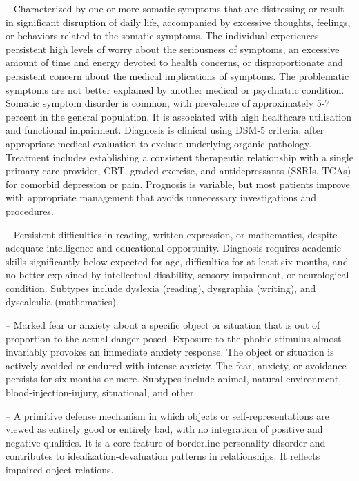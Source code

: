 -- Characterized by one or more somatic symptoms that are distressing or result in significant disruption of daily life, accompanied by excessive thoughts, feelings, or behaviors related to the somatic symptoms. The individual experiences persistent high levels of worry about the seriousness of symptoms, an excessive amount of time and energy devoted to health concerns, or disproportionate and persistent concern about the medical implications of symptoms. The problematic symptoms are not better explained by another medical or psychiatric condition. Somatic symptom disorder is common, with prevalence of approximately 5-7 percent in the general population. It is associated with high healthcare utilisation and functional impairment. Diagnosis is clinical using DSM-5 criteria, after appropriate medical evaluation to exclude underlying organic pathology. Treatment includes establishing a consistent therapeutic relationship with a single primary care provider, CBT, graded exercise, and antidepressants (SSRIs, TCAs) for comorbid depression or pain. Prognosis is variable, but most patients improve with appropriate management that avoids unnecessary investigations and procedures.

-- Persistent difficulties in reading, written expression, or mathematics, despite adequate intelligence and educational opportunity. Diagnosis requires academic skills significantly below expected for age, difficulties for at least six months, and no better explained by intellectual disability, sensory impairment, or neurological condition. Subtypes include dyslexia (reading), dysgraphia (writing), and dyscalculia (mathematics).

-- Marked fear or anxiety about a specific object or situation that is out of proportion to the actual danger posed. Exposure to the phobic stimulus almost invariably provokes an immediate anxiety response. The object or situation is actively avoided or endured with intense anxiety. The fear, anxiety, or avoidance persists for six months or more. Subtypes include animal, natural environment, blood-injection-injury, situational, and other.

-- A primitive defense mechanism in which objects or self-representations are viewed as entirely good or entirely bad, with no integration of positive and negative qualities. It is a core feature of borderline personality disorder and contributes to idealization-devaluation patterns in relationships. It reflects impaired object relations.

